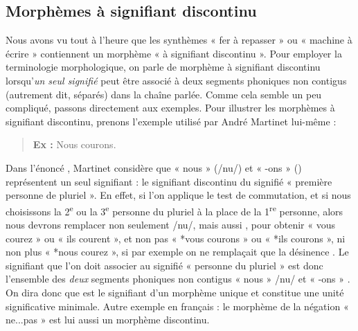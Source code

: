 \subsection{Morphèmes à signifiant discontinu}
Nous avons vu tout à l’heure que les synthèmes « fer à repasser » ou « machine à écrire » contiennent un morphème « à signifiant discontinu ». Pour employer la terminologie morphologique, on parle de morphème à signifiant discontinu lorsqu’\textit{un seul signifié} peut être associé à deux segments phoniques non contigus (autrement dit, séparés) dans la chaîne parlée. Comme cela semble un peu compliqué, passons directement aux exemples. Pour illustrer les morphèmes à signifiant discontinu, prenons l’exemple utilisé par André Martinet lui-même :
\begin{quote}\textbf{Ex :} Nous courons.\end{quote}
Dans l’énoncé , Martinet considère que « nous » (/nu/) et « -ons » () représentent un seul signifiant : le signifiant discontinu du signifié « première personne de pluriel ». En effet, si l’on applique le test de commutation, et si nous choisissons la 2\textsuperscript{e} ou la 3\textsuperscript{e} personne du pluriel à la place de la 1\textsuperscript{re} personne, alors nous devrons remplacer non seulement /nu/, mais aussi , pour obtenir « vous courez » ou « ils courent », et non pas « *vous courons » ou « *ils courons », ni non plus « *nous courez », si par exemple on ne remplaçait que la désinence . Le signifiant que l’on doit associer au signifié « personne du pluriel » est donc l’ensemble des \textit{deux} segments phoniques non contigus « nous » /nu/ et « -ons » . On dira donc que  est le signifiant d’un morphème unique et constitue une unité significative minimale. Autre exemple en français : le morphème de la négation « ne...pas » est lui aussi un morphème discontinu.

